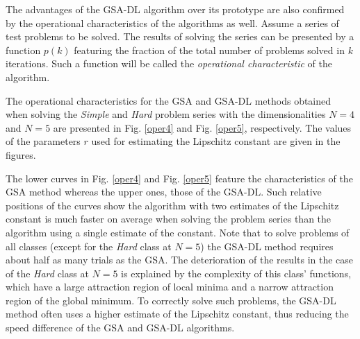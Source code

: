 \documentclass[runningheads]{llncs}
\begin{document}
The advantages of the GSA-DL algorithm over its prototype are also confirmed by the operational characteristics of the algorithms as well. Assume a series of test problems to be solved. The results of solving the series can be presented by a function $p(k)$ featuring the fraction of the total number of problems solved in $k$ iterations. Such a function will be called the \textit{operational characteristic} of the algorithm. 

The operational characteristics for the GSA and GSA-DL methods obtained when solving the \textit{Simple} and \textit{Hard} problem series with the dimensionalities $N=4$ and $N=5$ are presented in Fig. \ref{oper4} and Fig. \ref{oper5}, respectively. The values of the parameters $r$ used for estimating the Lipschitz constant are given in the figures.

The lower curves in Fig. \ref{oper4} and Fig. \ref{oper5} feature the characteristics of the GSA method whereas the upper ones, those of the GSA-DL. Such relative positions of the curves show the algorithm with two estimates of the Lipschitz constant is much faster on average when solving the problem series than the algorithm using a single estimate of the constant.
Note that to solve problems of all classes (except for the \textit{Hard} class at $N=5$) the GSA-DL method requires about half as many trials as the GSA. The deterioration of the results in the case of the \textit{Hard} class at $N=5$ is explained by the complexity of this class' functions, which have a large attraction region of local minima and a narrow attraction region of the global minimum. To correctly solve such problems, the GSA-DL method often uses a higher estimate of the Lipschitz constant, thus reducing the speed difference of the GSA and GSA-DL algorithms.

%




\end{document}
